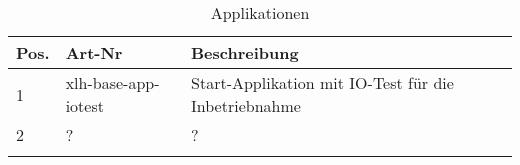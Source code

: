 \begin{table}[h]
\begin{threeparttable}
\caption{Applikationen \lernplattformname}
    \begin{tabularx}{\textwidth}{l | l | l }
        \thickhline
        \textbf{Pos.} & \textbf{Art-Nr} & \textbf{Beschreibung} \\
        \hline
        1 & xlh-base-app-iotest & Start-Applikation mit IO-Test für die Inbetriebnahme \\
        2 & ? & ?  \\
        \thickhline
    \end{tabularx}

\label{tab:applikationen}
\end{threeparttable}
\end{table}

